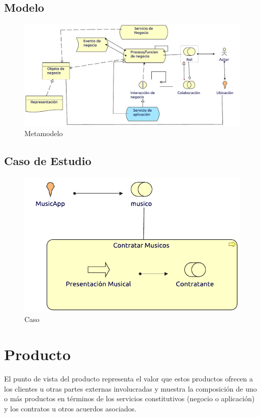 \subsection{Modelo}
\begin{figure}[h!]
	\centering
	\includegraphics[width=\linewidth]{Arquitectura/Negocio/imgs/ProcesoNegocioMetamodelo.pdf}
	\caption{Metamodelo}
\end{figure}
\newpage
\subsection{Caso de Estudio}

\begin{figure}[h!]
	\centering
	\includegraphics[width=\linewidth]{Arquitectura/Negocio/imgs/cooperacionProceso.pdf}
	\caption{Caso}
\end{figure}
\newpage

\section{Producto}
El punto de vista del producto representa el valor que estos productos ofrecen a los clientes u otras partes externas involucradas y muestra la composición de uno o más productos en términos de los servicios constitutivos (negocio o aplicación) y los contratos u otros acuerdos asociados. \\


